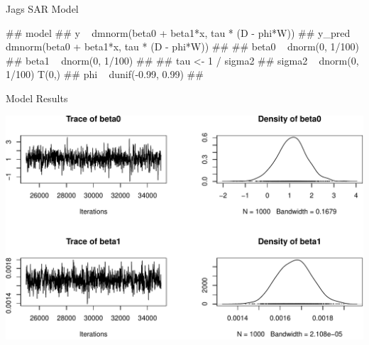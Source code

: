 \documentclass[11pt,ignorenonframetext,]{beamer}
\newenvironment{Shaded}{}{}
\newcommand{\KeywordTok}[1]{\textcolor[rgb]{0.00,0.44,0.13}{\textbf{#1}}}
\newcommand{\DataTypeTok}[1]{\textcolor[rgb]{0.56,0.13,0.00}{#1}}
\newcommand{\DecValTok}[1]{\textcolor[rgb]{0.25,0.63,0.44}{#1}}
\newcommand{\StringTok}[1]{\textcolor[rgb]{0.25,0.44,0.63}{#1}}
\newcommand{\OperatorTok}[1]{\textcolor[rgb]{0.40,0.40,0.40}{#1}}
\newcommand{\NormalTok}[1]{#1}
\let\oldShaded\Shaded
\let\endoldShaded\endShaded
\renewenvironment{Shaded}{\footnotesize\begin{spacing}{0.9}\oldShaded}{\endoldShaded\end{spacing}}
\let\oldverbatim\verbatim
\let\endoldverbatim\endverbatim
\renewenvironment{verbatim}{\footnotesize\begin{spacing}{0.9}\oldverbatim}{\endoldverbatim\end{spacing}}
\newcommand{\scriptoutput}{
  \renewenvironment{Shaded}{\scriptsize\begin{spacing}{0.9}\oldShaded}{\endoldShaded\end{spacing}}
  \renewenvironment{verbatim}{\scriptsize\begin{spacing}{0.9}\oldverbatim}{\endoldverbatim\end{spacing}}
}
\begin{document}
\begin{frame}[fragile,t]{Jags SAR Model}

\scriptoutput

\begin{verbatim}
## model{
##   y ~ dmnorm(beta0 + beta1*x, tau * (D - phi*W))
##   y_pred ~ dmnorm(beta0 + beta1*x, tau * (D - phi*W))
##   
##   beta0 ~ dnorm(0, 1/100)
##   beta1 ~ dnorm(0, 1/100)
## 
##   tau <- 1 / sigma2
##   sigma2 ~ dnorm(0, 1/100) T(0,)
##   phi ~ dunif(-0.99, 0.99)
## }
\end{verbatim}

\begin{Shaded}
\end{Shaded}

\end{frame}

\begin{frame}{Model Results}

\includegraphics{Lec19_files/figure-beamer/unnamed-chunk-22-1.pdf}

\end{frame}
\end{document}
